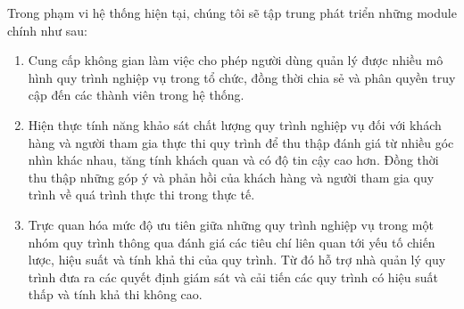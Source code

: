 Trong phạm vi hệ thống hiện tại, chúng tôi sẽ tập trung phát triển những module
chính như sau:

\begin{enumerate}
    \item Cung cấp không gian làm việc cho phép người dùng quản lý được nhiều mô hình quy
          trình nghiệp vụ trong tổ chức, đồng thời chia sẻ và phân quyền truy cập đến các
          thành viên trong hệ thống.

    \item Hiện thực tính năng khảo sát chất lượng quy trình nghiệp vụ đối với khách hàng
          và người tham gia thực thi quy trình để thu thập đánh giá từ nhiều góc nhìn
          khác nhau, tăng tính khách quan và có độ tin cậy cao hơn. Đồng thời thu thập
          những góp ý và phản hồi của khách hàng và người tham gia quy trình về quá trình
          thực thi trong thực tế.

    \item Trực quan hóa mức độ ưu tiên giữa những quy trình nghiệp vụ trong một nhóm quy
          trình thông qua đánh giá các tiêu chí liên quan tới yếu tố chiến lược, hiệu
          suất và tính khả thi của quy trình. Từ đó hỗ trợ nhà quản lý quy trình đưa ra
          các quyết định giám sát và cải tiến các quy trình có hiệu suất thấp và tính khả
          thi không cao.
\end{enumerate}